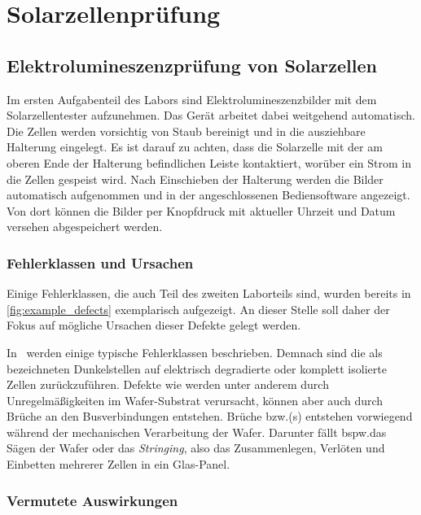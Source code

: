 \chapter{Solarzellenprüfung}

\section{Elektrolumineszenzprüfung von Solarzellen}

Im ersten Aufgabenteil des Labors sind Elektrolumineszenzbilder mit dem Solarzellentester aufzunehmen. Das Gerät arbeitet dabei weitgehend automatisch. Die Zellen werden vorsichtig von Staub bereinigt und in die ausziehbare Halterung eingelegt. Es ist darauf zu achten, dass die Solarzelle mit der am oberen Ende der Halterung befindlichen Leiste kontaktiert, worüber ein Strom in die Zellen gespeist wird. Nach Einschieben der Halterung werden die Bilder automatisch aufgenommen und in der angeschlossenen Bediensoftware angezeigt. Von dort können die Bilder per Knopfdruck mit aktueller Uhrzeit und Datum versehen abgespeichert werden.

\subsection{Fehlerklassen und Ursachen}

Einige Fehlerklassen, die auch Teil des zweiten Laborteils sind, wurden bereits in \cref{fig:example_defects} exemplarisch aufgezeigt. An dieser Stelle soll daher der Fokus auf mögliche Ursachen dieser Defekte gelegt werden.

In~\cite{Köntges2014,Deitsch2018} werden einige typische Fehlerklassen beschrieben. Demnach sind die als  bezeichneten Dunkelstellen auf elektrisch degradierte oder komplett isolierte Zellen zurückzuführen. Defekte wie  werden unter anderem durch Unregelmäßigkeiten im Wafer-Substrat verursacht, können aber auch durch Brüche an den Busverbindungen entstehen. Brüche bzw.\@ {}(s) entstehen vorwiegend während der mechanischen Verarbeitung der Wafer. Darunter fällt bspw.\@ das Sägen der Wafer oder das \emph{\foreignlanguage{english}{Stringing}}, also das Zusammenlegen, Verlöten und Einbetten mehrerer Zellen in ein Glas-Panel. %

\subsection{Vermutete Auswirkungen}

